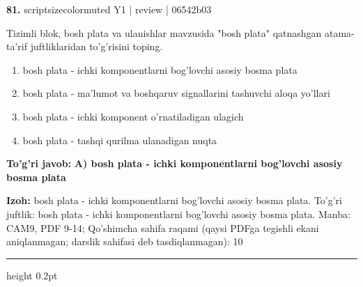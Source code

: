\documentclass[10pt,a4paper]{article}
\begin{document}
{\bfseries\sffamily\color{ink} 81.} {scriptsizecolor{muted} Y1 | review | 06542b03}
\par
Tizimli blok, bosh plata va ulanishlar mavzusida "bosh plata" qatnashgan atama-ta'rif juftliklaridan to'g'risini toping.
\begin{enumerate}[label=\Alph*),leftmargin=9mm]
\item bosh plata - ichki komponentlarni bog'lovchi asosiy bosma plata
\item bosh plata - ma'lumot va boshqaruv signallarini tashuvchi aloqa yo'llari
\item bosh plata - ichki komponent o'rnatiladigan ulagich
\item bosh plata - tashqi qurilma ulanadigan nuqta
\end{enumerate}
\begin{tcolorbox}[enhanced,breakable,colback=teal!4,colframe=teal!60!black,boxrule=0.45pt,arc=1.2mm,left=2.7mm,right=2.7mm,top=1.8mm,bottom=1.8mm,before skip=2mm,after skip=2mm]
{\bfseries\sffamily\color{teal}To'g'ri javob:} \textbf{A) bosh plata - ichki komponentlarni bog'lovchi asosiy bosma plata}
\par\smallskip
{\bfseries Izoh:} bosh plata - ichki komponentlarni bog'lovchi asosiy bosma plata. To'g'ri juftlik: bosh plata - ichki komponentlarni bog'lovchi asosiy bosma plata. Manba: CAM9, PDF 9-14; Qo'shimcha sahifa raqami (qaysi PDFga tegishli ekani aniqlanmagan; darslik sahifasi deb tasdiqlanmagan): 10
\end{tcolorbox}
\vspace{2mm}\hrule height 0.2pt\vspace{3mm}
\end{document}

